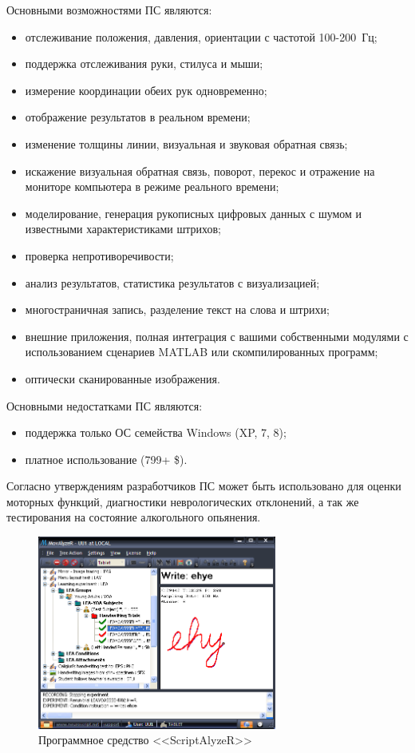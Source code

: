 Основными возможностями ПС являются:
\begin{itemize}
  \item отслеживание положения, давления, ориентации с частотой \mbox{100-200 Гц;}
	\item поддержка отслеживания руки, стилуса и мыши;
	\item измерение координации обеих рук одновременно;
	\item отображение результатов в реальном времени;
	\item изменение толщины линии, визуальная и звуковая обратная связь;
	\item искажение визуальная обратная связь, поворот, перекос и отражение на мониторе компьютера в режиме реального времени;
	\item моделирование, генерация рукописных цифровых данных с шумом и известными характеристиками штрихов;
	\item проверка непротиворечивости;
	\item анализ результатов, статистика результатов с визуализацией;
	\item многостраничная запись, разделение текст на слова и штрихи;
	\item внешние приложения, полная интеграция с вашими собственными модулями с использованием сценариев MATLAB или скомпилированных программ;
	\item оптически сканированные изображения.
\end{itemize}

Основными недостатками ПС являются:
\begin{itemize}
  \item поддержка только ОС семейства Windows (XP, 7, 8);
  \item платное использование (799+ \$).
\end{itemize}

Согласно утверждениям разработчиков ПС может быть использовано для оценки моторных функций, диагностики неврологических отклонений, а так же тестирования на состояние алкогольного опьянения.

\begin{figure}[ht]
    \centering
    \includegraphics[width=0.7\textwidth]{figures/neuroscript.png}
    \caption{Программное средство <<ScriptAlyzeR>>}
    \label{fig:domain:analogs:neuro_script}
\end{figure}

